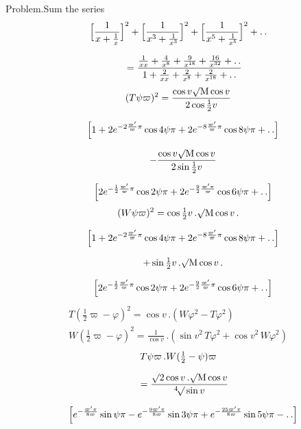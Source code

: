 \begingroup
\renewcommand{\arraystretch}{1.45}

\noindent Problem.\quad Sum the series
\[
\begin{gathered}\Bigl[\frac{1}{x+\frac1x}\Bigr]^{2}
+\Bigl[\frac{1}{x^{3}+\frac1{x^{3}}}\Bigr]^{2}
+\Bigl[\frac{1}{x^{5}+\frac1{x^{5}}}\Bigr]^{2}+ .\,.
\\[7pt]\quad{}=\frac{\frac1{xx}+\frac4{x^{8}}+\frac9{x^{18}}+\frac{16}{x^{32}}+ .\,.}
{1+\frac2{xx}+\frac2{x^{8}}+\frac2{x^{18}}+ .\,.}\end{gathered}
\]
\[
\begin{gathered}
(T\psi\varpi)^{2}
=\frac{\cos v\surd\mathrm{M}\cos v}{2\cos\frac12v}
\\[7pt]\quad{}\Bigl[1+2e^{-2\frac{\varpi'}{\varpi}\pi}\cos4\psi\pi
+2e^{-8\frac{\varpi'}{\varpi}\pi}\cos8\psi\pi+ .\,.\Bigr]
\\[7pt]
\quad-\frac{\cos v\surd\mathrm{M}\cos v}{2\sin\frac12v}
\\[7pt]\quad{}\Bigl[2e^{-\frac12\frac{\varpi'}{\varpi}\pi}\cos2\psi\pi
+2e^{-\frac92\frac{\varpi'\pi}{\varpi}}\cos6\psi\pi+ .\,.\Bigr]
\end{gathered}
\]
\[
\begin{gathered}
(W\psi\varpi)^{2}
=\cos\tfrac12v\,.\surd\mathrm{M}\cos v\,.
\\[7pt]\quad{}\Bigl[1+2e^{-2\frac{\varpi'}{\varpi}\pi}\cos4\psi\pi
+2e^{-8\frac{\varpi'}{\varpi}\pi}\cos8\psi\pi+ .\,.\Bigr]
\\[7pt]
\quad+\sin\tfrac12v\,.\surd\mathrm{M}\cos v\,.
\\[7pt]\quad{}\Bigl[2e^{-\frac12\frac{\varpi'}{\varpi}\pi}\cos2\psi\pi
+2e^{-\frac92\frac{\varpi'}{\varpi}\pi}\cos6\psi\pi+ .\,.\Bigr]
\end{gathered}
\]
\[
\begin{gathered}
T(\tfrac12\varpi-\varphi)^{2}=\cos v\,.(W\varphi^{2}-T\varphi^{2})
\\[7pt]
W(\tfrac12\varpi-\varphi)^{2}=\frac1{\cos v}\,.(\sin v^{2}\,T\varphi^{2}+\cos v^{2}\,W\varphi^{2})
\end{gathered}
\]
\[
\begin{gathered}T\psi\varpi\,.W(\tfrac12-\psi)\varpi
\\[7pt]\quad{}=\frac{\surd2\cos v\,.\surd\mathrm{M}\cos v}{{}^{4}\!\surd\sin v}
\\[7pt]\quad{}\Bigl[e^{-\frac{\varpi'\pi}{8\varpi}}\sin\psi\pi
-e^{-\frac{9\varpi'\pi}{8\varpi}}\sin3\psi\pi
+e^{-\frac{25\varpi'\pi}{8\varpi}}\sin5\psi\pi- .\,.\Bigr]\end{gathered}
\]
